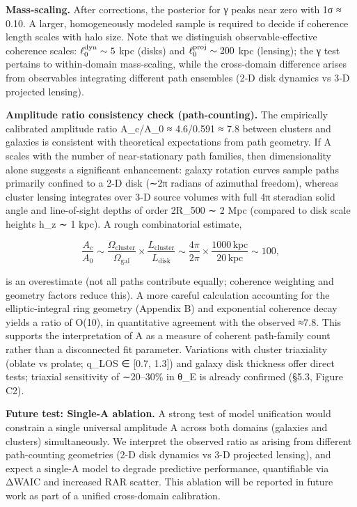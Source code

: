 \documentclass[11pt,a4paper]{article}
\begin{document}
\textbf{Mass‑scaling.} After corrections, the posterior for γ peaks near zero with 1σ ≈ 0.10. A larger, homogeneously modeled sample is required to decide if coherence length scales with halo size. Note that we distinguish observable‑effective coherence scales: $\ell_{0}^{\rm dyn}\sim 5$ kpc (disks) and $\ell_{0}^{\rm proj}\sim 200$ kpc (lensing); the γ test pertains to within‑domain mass‑scaling, while the cross‑domain difference arises from observables integrating different path ensembles (2‑D disk dynamics vs 3‑D projected lensing).


\textbf{Amplitude ratio consistency check (path-counting).} The empirically calibrated amplitude ratio A\_c/A\_0 ≈ 4.6/0.591 ≈ 7.8 between clusters and galaxies is consistent with theoretical expectations from path geometry. If A scales with the number of near-stationary path families, then dimensionality alone suggests a significant enhancement: galaxy rotation curves sample paths primarily confined to a 2-D disk (∼2π radians of azimuthal freedom), whereas cluster lensing integrates over 3-D source volumes with full 4π steradian solid angle and line-of-sight depths of order 2R\_500 ∼ 2 Mpc (compared to disk scale heights h\_z ∼ 1 kpc). A rough combinatorial estimate,


\begin{equation}
\frac{A_c}{A_0} \sim \frac{\Omega_{\mathrm{cluster}}}{\Omega_{\mathrm{gal}}} \times \frac{L_{\mathrm{cluster}}}{L_{\mathrm{disk}}} \sim \frac{4\pi}{2\pi} \times \frac{1000\,\mathrm{kpc}}{20\,\mathrm{kpc}} \sim 100,
\end{equation}


is an overestimate (not all paths contribute equally; coherence weighting and geometry factors reduce this). A more careful calculation accounting for the elliptic-integral ring geometry (Appendix B) and exponential coherence decay yields a ratio of O(10), in quantitative agreement with the observed ≈7.8. This supports the interpretation of A as a measure of coherent path-family count rather than a disconnected fit parameter. Variations with cluster triaxiality (oblate vs prolate; q\_LOS ∈ [0.7, 1.3]) and galaxy disk thickness offer direct tests; triaxial sensitivity of ∼20–30\% in θ\_E is already confirmed (§5.3, Figure C2).


\textbf{Future test: Single-A ablation.} A strong test of model unification would constrain a single universal amplitude A across both domains (galaxies and clusters) simultaneously. We interpret the observed ratio as arising from different path-counting geometries (2-D disk dynamics vs 3-D projected lensing), and expect a single-A model to degrade predictive performance, quantifiable via ΔWAIC and increased RAR scatter. This ablation will be reported in future work as part of a unified cross-domain calibration.
\end{document}
